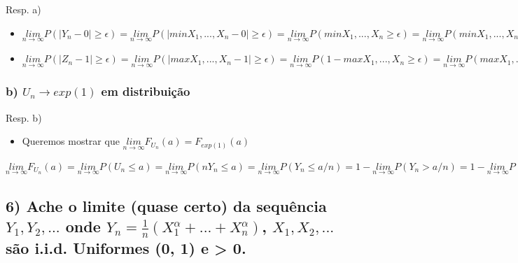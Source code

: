 \documentclass[portuguese]{article}
\DeclareRobustCommand{\greektext}{%
  \fontencoding{LGR}\selectfont\def\encodingdefault{LGR}}
\DeclareRobustCommand{\textgreek}[1]{\leavevmode{\greektext #1}}
\begin{document}
Resp. a)
\begin{itemize}
\item $\underset{n\rightarrow\infty}{lim}P(\left|Y_{n}-0\right|\ge\epsilon)=\underset{n\rightarrow\infty}{lim}P(\left|min{X_{1},...,X_{n}}-0\right|\ge\epsilon)=\underset{n\rightarrow\infty}{lim}P(min{X_{1},...,X_{n}}\ge\epsilon)=\underset{n\rightarrow\infty}{lim}P(min{X_{1},...,X_{n}}\ge\epsilon)\overset{ind.}{=}\underset{n\rightarrow\infty}{lim}(P(X\ge\epsilon))^{n}=\underset{n\rightarrow\infty}{lim}(1-\epsilon)^{n}=0$
\item $\underset{n\rightarrow\infty}{lim}P(\left|Z_{n}-1\right|\ge\epsilon)=\underset{n\rightarrow\infty}{lim}P(\left|max{X_{1},...,X_{n}}-1\right|\ge\epsilon)=\underset{n\rightarrow\infty}{lim}P(1-max{X_{1},...,X_{n}}\ge\epsilon)=\underset{n\rightarrow\infty}{lim}P(max{X_{1},...,X_{n}}\le1-\epsilon)\overset{ind.}{=}\underset{n\rightarrow\infty}{lim}P(X_{1}\le1-\epsilon)^{n}=\underset{n\rightarrow\infty}{lim}(1-\epsilon)^{n}=0$
\end{itemize}

\subsubsection*{\textmd{b) $U_{n}\rightarrow exp(1)$ em distribuição}}

Resp. b)
\begin{itemize}
\item Queremos mostrar que $\underset{n\rightarrow\infty}{lim}F_{U_{n}}(a)=F_{exp(1)}(a)$
\end{itemize}
$\underset{n\rightarrow\infty}{lim}F_{U_{n}}(a)=\underset{n\rightarrow\infty}{lim}P(U_{n}\le a)=\underset{n\rightarrow\infty}{lim}P(nY_{n}\le a)=\underset{n\rightarrow\infty}{lim}P(Y_{n}\le a/n)=1-\underset{n\rightarrow\infty}{lim}P(Y_{n}>a/n)=1-\underset{n\rightarrow\infty}{lim}P(min{X_{1},...,X_{n}}>a/n)=1-\underset{n\rightarrow\infty}{lim}P(X_{1}>a/n)^{n}=1-\underset{n\rightarrow\infty}{lim}(1-\frac{a}{n})^{n}\overset{6}{=}1-e^{-a}=\int_{-\infty}^{a}1\cdot e^{-1\cdot u}du=F_{exp(1)}(a)$


\subsection*{\textcompwordmark{}}


\subsection*{\textmd{6) Ache o limite (quase certo) da sequência $Y_{1},Y_{2},...$
onde $Y_{n}=\frac{1}{n}(X_{1}^{\alpha}+...+X_{n}^{\alpha})$, $X_{1},X_{2},...$
são i.i.d. Uniformes (0, 1) e \textgreek{a} > 0.}}
\end{document}
